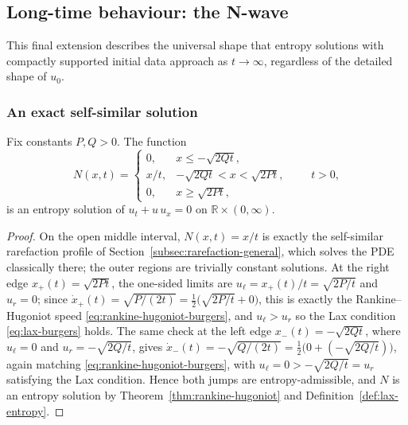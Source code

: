 \subsection{Long-time behaviour: the N-wave}
\label{subsec:n-wave}

This final extension describes the universal shape that entropy
solutions with compactly supported initial data approach as $t \to
\infty$, regardless of the detailed shape of $u_0$.

\subsubsection{An exact self-similar solution}
\label{subsubsec:n-wave-exact}

\begin{proposition}
\label{prop:n-wave-exact}
Fix constants $P, Q > 0$. The function
\begin{equation}
  \label{eq:n-wave}
  N(x,t) = \begin{cases}
    0, & x \le -\sqrt{2Qt}, \\
    x/t, & -\sqrt{2Qt} < x < \sqrt{2Pt}, \\
    0, & x \ge \sqrt{2Pt},
  \end{cases}
  \qquad t>0,
\end{equation}
is an entropy solution of $u_t+u\,u_x=0$ on $\mathbb{R}\times(0,\infty)$.
\end{proposition}

\begin{proof}
On the open middle interval, $N(x,t)=x/t$ is exactly the self-similar
rarefaction profile of Section~\ref{subsec:rarefaction-general}, which
solves the PDE classically there; the outer regions are trivially
constant solutions. At the right edge $x_+(t)=\sqrt{2Pt}$, the one-sided
limits are $u_\ell = x_+(t)/t = \sqrt{2P/t}$ and $u_r=0$; since
$\dot x_+(t) = \sqrt{P/(2t)} = \tfrac12\big(\sqrt{2P/t}+0\big)$, this is
exactly the Rankine--Hugoniot speed \eqref{eq:rankine-hugoniot-burgers},
and $u_\ell > u_r$ so the Lax condition \eqref{eq:lax-burgers} holds. The
same check at the left edge $x_-(t)=-\sqrt{2Qt}$, where $u_\ell=0$ and
$u_r=-\sqrt{2Q/t}$, gives $\dot x_-(t) = -\sqrt{Q/(2t)} =
\tfrac12\big(0+(-\sqrt{2Q/t})\big)$, again matching
\eqref{eq:rankine-hugoniot-burgers}, with $u_\ell=0>-\sqrt{2Q/t}=u_r$
satisfying the Lax condition. Hence both jumps are entropy-admissible,
and $N$ is an entropy solution by Theorem~\ref{thm:rankine-hugoniot} and
Definition~\ref{def:lax-entropy}.
\end{proof}

